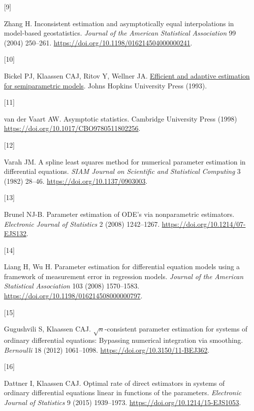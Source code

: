 \documentclass[ejs]{imsart}
\newlength{\cslhangindent}\setlength{\cslhangindent}{1.5em}
\newlength{\csllabelwidth}\setlength{\csllabelwidth}{3em}
\newenvironment{CSLReferences}[2]
 {\begin{list}{}{\setlength{\itemindent}{0pt}\setlength{\leftmargin}{0pt}\setlength{\parsep}{0pt}
 \ifodd #1\setlength{\leftmargin}{\cslhangindent}\setlength{\itemindent}{-1\cslhangindent}\fi
 \setlength{\itemsep}{#2\baselineskip}}}{\end{list}}
\newcommand{\CSLLeftMargin}[1]{\parbox[t]{\csllabelwidth}{\strut#1\strut}}
\newcommand{\CSLRightInline}[1]{\parbox[t]{\linewidth-\csllabelwidth}{\strut#1\strut}}
\begin{document}
\begin{CSLReferences}{0}{0}
\CSLLeftMargin{{[}9{]} }%
\CSLRightInline{Zhang H. Inconsistent estimation and asymptotically
equal interpolations in model-based geostatistics. \emph{Journal of the
American Statistical Association} 99 (2004) 250--261.
\url{https://doi.org/10.1198/016214504000000241}.}

\CSLLeftMargin{{[}10{]} }%
\CSLRightInline{Bickel PJ, Klaassen CAJ, Ritov Y, Wellner JA.
\href{https://faculty.washington.edu/jonw/RESEARCH/BOOKS/book3.html}{Efficient
and adaptive estimation for semiparametric models}. Johns Hopkins
University Press (1993).}

\CSLLeftMargin{{[}11{]} }%
\CSLRightInline{{van der Vaart AW}. Asymptotic statistics. Cambridge
University Press (1998) \url{https://doi.org/10.1017/CBO9780511802256}.}

\CSLLeftMargin{{[}12{]} }%
\CSLRightInline{Varah JM. A spline least squares method for numerical
parameter estimation in differential equations. \emph{SIAM Journal on
Scientific and Statistical Computing} 3 (1982) 28--46.
\url{https://doi.org/10.1137/0903003}.}

\CSLLeftMargin{{[}13{]} }%
\CSLRightInline{Brunel NJ-B. Parameter estimation of {ODE}'s via
nonparametric estimators. \emph{Electronic Journal of Statistics} 2
(2008) 1242--1267. \url{https://doi.org/10.1214/07-EJS132}.}

\CSLLeftMargin{{[}14{]} }%
\CSLRightInline{Liang H, Wu H. Parameter estimation for differential
equation models using a framework of measurement error in regression
models. \emph{Journal of the American Statistical Association} 103
(2008) 1570--1583. \url{https://doi.org/10.1198/016214508000000797}.}

\CSLLeftMargin{{[}15{]} }%
\CSLRightInline{Gugushvili S, Klaassen CAJ. \(\sqrt{n}\)-consistent
parameter estimation for systems of ordinary differential equations:
Bypassing numerical integration via smoothing. \emph{Bernoulli} 18
(2012) 1061--1098. \url{https://doi.org/10.3150/11-BEJ362}.}

\CSLLeftMargin{{[}16{]} }%
\CSLRightInline{Dattner I, Klaassen CAJ. Optimal rate of direct
estimators in systems of ordinary differential equations linear in
functions of the parameters. \emph{Electronic Journal of Statistics} 9
(2015) 1939--1973. \url{https://doi.org/10.1214/15-EJS1053}.}


\end{CSLReferences}
\end{document}
